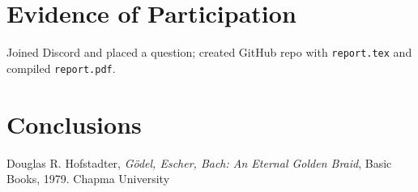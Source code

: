 \documentclass{article}
\theoremstyle{theorem}
\theoremstyle{definition}
\theoremstyle{remark}
\begin{document}
\section{Evidence of Participation}
Joined Discord and placed a question; created GitHub repo with \texttt{report.tex} and compiled \texttt{report.pdf}.

\section{Conclusions}\label{conclusion}

\begin{thebibliography}{99}
 Douglas R. Hofstadter, \emph{Gödel, Escher, Bach: An Eternal Golden Braid}, Basic Books, 1979. Chapma University
\end{thebibliography}
\end{document}
